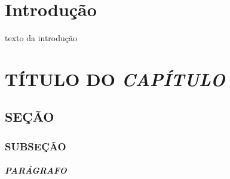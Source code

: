 \documentclass[oneside,12pt]{abntex2}
\begin{document}

\tableofcontents* %




\textual


\chapter{Introdução}

texto da introdução



\chapter{TÍTULO DO \textit{CAPÍTULO}}

	\section{SEÇÃO}
	
		\subsection{SUBSEÇÃO}
		
\paragraph{PARÁGRAFO}




\postextual



\end{document}
